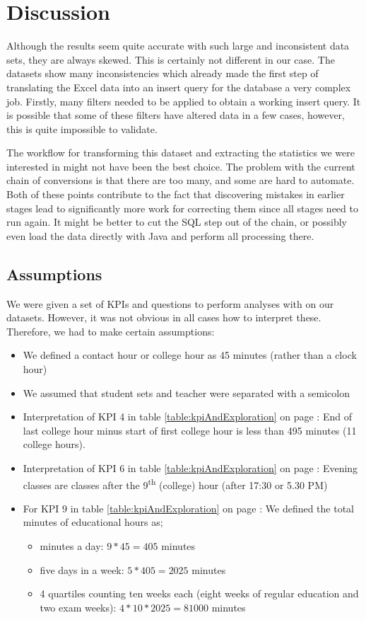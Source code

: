 \section{Discussion}
Although the results seem quite accurate with such large and inconsistent data sets, they are always skewed. This is certainly not different in our case. The datasets show many inconsistencies which already made the first step of translating the Excel data into an insert query for the database a very complex job. Firstly, many filters needed to be applied to obtain a working insert query. It is possible that some of these filters have altered data in a few cases, however, this is quite impossible to validate.

The workflow for transforming this dataset and extracting the statistics we were interested in might not have been the best choice. The problem with the current chain of conversions is that there are too many, and some are hard to automate. Both of these points contribute to the fact that discovering mistakes in earlier stages lead to significantly more work for correcting them since all stages need to run again. It might be better to cut the SQL step out of the chain, or possibly even load the data directly with Java and perform all processing there.

\subsection{Assumptions}
We were given a set of KPIs and questions to perform analyses with on our datasets. However, it was not obvious in all cases how to interpret these. Therefore, we had to make certain assumptions:
\begin{itemize}
	\item We defined a contact hour or college hour as 45 minutes (rather than a clock hour)
	\item We assumed that student sets and teacher were separated with a semicolon
	\item Interpretation of KPI 4 in table \ref{table:kpiAndExploration} on page \pageref{table:kpiAndExploration}: End of last college hour minus start of first college hour is less than 495 minutes (11 college hours).
	\item Interpretation of KPI 6 in table \ref{table:kpiAndExploration} on page \pageref{table:kpiAndExploration}: Evening classes are classes after the 9\textsuperscript{th} (college) hour (after 17:30 or 5.30 PM)
	\item For KPI 9 in table \ref{table:kpiAndExploration} on page \pageref{table:kpiAndExploration}: We defined the total minutes of educational hours as;
	\begin{itemize} 
	\item minutes a day: $9*45=405$ minutes
	\item five days in a week: $5*405=2025$ minutes
	\item 4 quartiles counting ten weeks each (eight weeks of regular education and two exam weeks): $4*10*2025=81000$ minutes
	\end{itemize}
\end{itemize}

